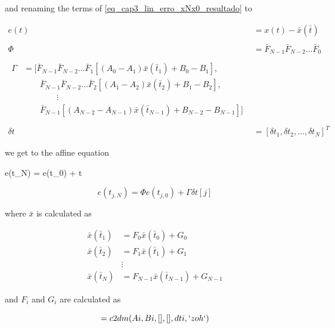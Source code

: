 and renaming the terms of \eqref{eq_cap3_lin_erro_xNx0_resultado} to

\noindent
\begin{align}
	e(t) &= x(t) - \bar{x}(\bar{t}) \\ \nonumber \\
	\Phi &= \bar{F}_{N-1} \bar{F}_{N-2} \ldots \bar{F}_{0} \\ \nonumber \\
	\begin{split}
		\Gamma &= \Big[ \bar{F}_{N-1}\bar{F}_{N-2} \ldots \bar{F}_{1} [(A_0 - A_1) \bar{x}(\bar{t}_1) + B_0 - B_1], \\
		& \qquad \bar{F}_{N-1}\bar{F}_{N-2} \ldots \bar{F}_{2} [(A_1 - A_2) \bar{x}(\bar{t}_2) + B_1 - B_2], \\
		& \qquad \qquad \vdots \\
		& \qquad \bar{F}_{N-1}[(A_{N-2} - A_{N-1}) \bar{x}(\bar{t}_{N-1}) + B_{N-2} - B_{N-1}]\Big]
	\end{split} \\ \nonumber \\
	\delta t &= [\delta t_1, \delta t_2, \ldots, \delta t_N]^T
\end{align}

\noindent
we get to the affine equation

\noindent
\begin{tcolorbox}[ams align,colback=white]
	\label{eq_eNe0_result}
	e(t_N) = \Phi e(t_0) + \Gamma \delta t
\end{tcolorbox}


\noindent
\begin{equation}
	e(t_{j,N}) = \Phi e(t_{j,0}) + \Gamma \delta t[j]
\end{equation}


\noindent 
where $\bar{x}$ is calculated as

\noindent
\begin{align}
	\bar{x}(\bar{t}_1) &= F_0 \bar{x}(\bar{t}_0) + G_0 \\
    \bar{x}(\bar{t}_2) &= F_1 \bar{x}(\bar{t}_1) + G_1 \\
    &\vdots \nonumber \\
    \bar{x}(\bar{t}_N) &= F_{N-1} \bar{x}(\bar{t}_{N-1}) + G_{N-1}
\end{align}

\noindent
and $F_i$ and $G_i$ are calculated as

\noindent
\begin{equation}
	[F_i, G_i] = c2dm(Ai, Bi, [], [], dti, `zoh`)
\end{equation}